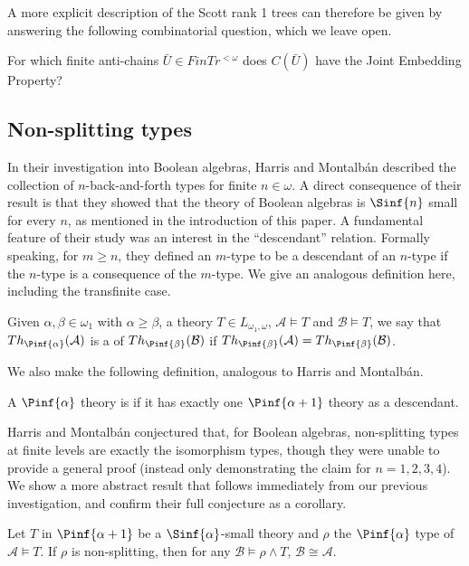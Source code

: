 \documentclass{amsart}
\renewcommand{\-}{\text{-}}
\begin{document}
A more explicit description of the Scott rank 1 trees can therefore be given by answering the following combinatorial question, which we leave open.
\begin{question}
For which finite anti-chains $\bar{U}\in FinTr^{<\omega}$ does $C(\bar{U})$ have the Joint Embedding Property?
\end{question}

\subsection{Non-splitting types}
In their investigation into Boolean algebras, Harris and Montalbán \cite{HM} described the collection of $n$-back-and-forth types for finite $n\in\omega$.
A direct consequence of their result is that they showed that the theory of Boolean algebras is $\Sinf{n}$ small for every $n$, as mentioned in the introduction of this paper.
A fundamental feature of their study was an interest in the ``descendant'' relation.
Formally speaking, for $m\geq n$, they defined an $m$-type to be a descendant of an $n$-type if the $n$-type is a consequence of the $m$-type.
We give an analogous definition here, including the transfinite case.
\begin{definition}
Given $\alpha,\beta\in\omega_1$ with $\alpha\geq\beta$, a theory $T\in L_{\omega_1,\omega}$, $\mathcal{A}\models T$ and  $\mathcal{B}\models T$, we say that $Th_{\Pinf{\alpha}}(\mathcal{A})$ is a  of $Th_{\Pinf{\beta}}(\mathcal{B})$ if $Th_{\Pinf{\beta}}(\mathcal{A}) = Th_{\Pinf{\beta}}(\mathcal{B})$.
\end{definition}

We also make the following definition, analogous to Harris and Montalbán.
\begin{definition}
A $\Pinf{\alpha}$ theory is  if it has exactly one $\Pinf{\alpha+1}$ theory as a descendant.
\end{definition}

Harris and Montalbán conjectured that, for Boolean algebras, non-splitting types at finite levels are exactly the isomorphism types, though they were unable to provide a general proof (instead only demonstrating the claim for $n=1,2,3,4$).
We show a more abstract result that follows immediately from our previous investigation, and confirm their full conjecture as a corollary.

\begin{proposition}\label{prop:nonsplittingTypes}
  Let $T$ in $\Pinf{\alpha+1}$ be a $\Sinf{\alpha}$-small theory and $\rho$ the $\Pinf{\alpha}$ type of $\mathcal{A}\models T$.
If $\rho$ is non-splitting, then for any $\mathcal{B}\models\rho\land T$, $\mathcal{B}\cong\mathcal{A}$.
\end{proposition}
\end{document}
